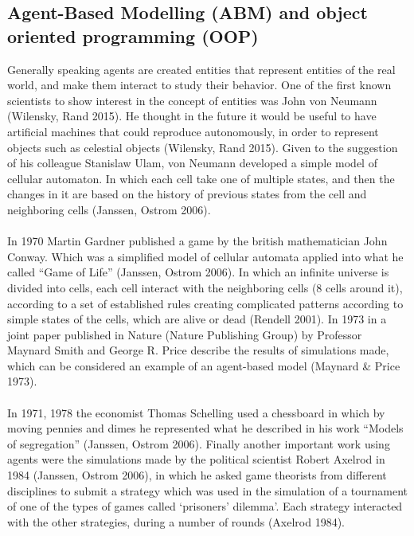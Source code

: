 \documentclass{article}
\begin{document}
\subsection{Agent-Based Modelling (ABM) and object oriented programming (OOP)}
Generally speaking agents are created entities that represent entities of the real world, and make them interact to study their behavior. One of the first known scientists to show interest in the concept of entities was John von Neumann (Wilensky, Rand 2015). He thought in the future it would be useful to have artificial machines that could reproduce autonomously, in order to represent objects such as celestial objects (Wilensky, Rand 2015). Given to the suggestion of his colleague Stanislaw Ulam, von Neumann developed a simple model of cellular automaton. In which each cell take one of multiple states, and then the changes in it are based on the history of previous states from the cell and neighboring cells (Janssen, Ostrom 2006).
\\\\In 1970 Martin Gardner published a game by the british mathematician John Conway. Which was a simplified model of cellular automata applied into what he called “Game of Life” (Janssen, Ostrom 2006). In which an infinite universe is divided into cells, each cell interact with the neighboring cells (8 cells around it), according to a set of established rules creating complicated patterns according to simple states of the cells, which are alive or dead (Rendell 2001). In 1973 in a joint paper published in Nature (Nature Publishing Group)  by Professor Maynard Smith and George R. Price describe the results of simulations made, which can be considered an example of an agent-based model (Maynard \& Price 1973).
\\\\In 1971, 1978 the economist Thomas Schelling used a chessboard in which by moving pennies and dimes he represented what he described in his work “Models of segregation” (Janssen, Ostrom 2006).  Finally another important work using agents were the simulations made by the political scientist Robert Axelrod in 1984 (Janssen, Ostrom 2006), in which he asked game theorists from different disciplines to submit a strategy which was used in the simulation of a tournament of one of the types of games called ‘prisoners’ dilemma’. Each strategy interacted with the other strategies, during a number of rounds (Axelrod 1984).
\end{document}
